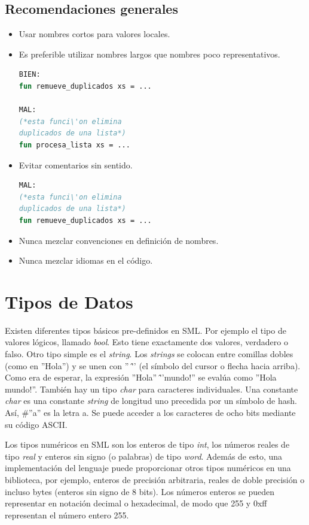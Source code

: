 \documentclass[10pt,journal,compsoc]{IEEEtran}
\begin{document}
\subsection{Recomendaciones generales}
\begin{itemize}
	\item Usar nombres cortos para valores locales.
	\item Es preferible utilizar nombres largos que nombres poco representativos.
\begin{lstlisting}[language=ML, caption=Recomendaci\'on nombres]
BIEN:
fun remueve_duplicados xs = ...	

MAL:
(*esta funci\'on elimina
duplicados de una lista*)
fun procesa_lista xs = ...
\end{lstlisting}
	\item Evitar comentarios sin sentido.
\begin{lstlisting}[language=ML, caption=Recomendaci\'on comentarios]
MAL:
(*esta funci\'on elimina
duplicados de una lista*)
fun remueve_duplicados xs = ...	
\end{lstlisting}
	\item Nunca mezclar convenciones en definici\'on de nombres.
	\item Nunca mezclar idiomas en el c\'odigo.
\end{itemize}

\section{Tipos de Datos}
Existen diferentes tipos b\'asicos pre-definidos en SML. Por ejemplo el tipo de valores l\'ogicos, llamado \textit{bool}. Esto tiene exactamente dos valores, verdadero o falso. Otro tipo simple es el \textit{string}. Los \textit{strings} se colocan entre comillas dobles (como en ''Hola'') y se unen con '' \^ '' (el símbolo del cursor o flecha hacia arriba). Como era de esperar, la expresión ''Hola'' \^ ''mundo!'' se eval\'ua como ''Hola mundo!''. Tambi\'en hay un tipo \textit{char} para caracteres individuales. Una constante \textit{char} es una constante \textit{string} de longitud uno precedida por un s\'imbolo de hash. As\'i, \#''a'' es la letra a. Se puede acceder a los caracteres de ocho bits mediante su c\'odigo ASCII.

Los tipos numéricos en SML son los enteros de tipo \textit{int}, los n\'umeros reales de tipo \textit{real} y enteros sin signo (o palabras) de tipo \textit{word}. Adem\'as de esto, una implementaci\'on del lenguaje puede proporcionar otros tipos num\'ericos en una biblioteca, por ejemplo, enteros de precisi\'on arbitraria, reales de doble precisi\'on o incluso bytes (enteros sin signo de 8 bits). Los n\'umeros enteros se pueden representar en notaci\'on decimal o hexadecimal, de modo que 255 y 0xff representan el n\'umero entero 255.
\end{document}
